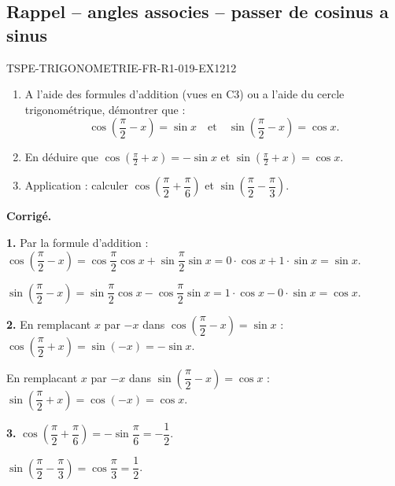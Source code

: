 

\subsection*{Rappel -- angles associes -- passer de cosinus a sinus}

\begin{exercice}{TSPE-TRIGONOMETRIE-FR-R1-019-EX1}{2}{12}
\begin{enumerate}
  \item A l'aide des formules d'addition (vues en C3) ou a l'aide du cercle trigonométrique, démontrer que :
  \[
    \cos\!\left(\frac{\pi}{2} - x\right) = \sin x \quad \text{et} \quad \sin\!\left(\frac{\pi}{2} - x\right) = \cos x.
  \]
  \item En déduire que $\cos\!\left(\frac{\pi}{2} + x\right) = -\sin x$ et $\sin\!\left(\frac{\pi}{2} + x\right) = \cos x$.
  \item Application : calculer $\cos\!\left(\dfrac{\pi}{2} + \dfrac{\pi}{6}\right)$ et $\sin\!\left(\dfrac{\pi}{2} - \dfrac{\pi}{3}\right)$.
\end{enumerate}
\end{exercice}

\medskip
\noindent\textbf{Corrigé.}

\textbf{1.} Par la formule d'addition :
$\cos\!\left(\dfrac{\pi}{2} - x\right) = \cos\dfrac{\pi}{2}\cos x + \sin\dfrac{\pi}{2}\sin x = 0 \cdot \cos x + 1 \cdot \sin x = \sin x$.

$\sin\!\left(\dfrac{\pi}{2} - x\right) = \sin\dfrac{\pi}{2}\cos x - \cos\dfrac{\pi}{2}\sin x = 1 \cdot \cos x - 0 \cdot \sin x = \cos x$.

\textbf{2.} En remplacant $x$ par $-x$ dans $\cos\!\left(\dfrac{\pi}{2} - x\right) = \sin x$ :
$\cos\!\left(\dfrac{\pi}{2} + x\right) = \sin(-x) = -\sin x$.

En remplacant $x$ par $-x$ dans $\sin\!\left(\dfrac{\pi}{2} - x\right) = \cos x$ :
$\sin\!\left(\dfrac{\pi}{2} + x\right) = \cos(-x) = \cos x$.

\textbf{3.} $\cos\!\left(\dfrac{\pi}{2} + \dfrac{\pi}{6}\right) = -\sin\dfrac{\pi}{6} = -\dfrac{1}{2}$.

$\sin\!\left(\dfrac{\pi}{2} - \dfrac{\pi}{3}\right) = \cos\dfrac{\pi}{3} = \dfrac{1}{2}$.
